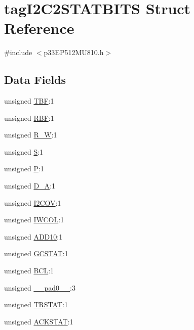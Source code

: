 \hypertarget{structtag_i2_c2_s_t_a_t_b_i_t_s}{}\section{tag\+I2\+C2\+S\+T\+A\+T\+B\+I\+TS Struct Reference}
\label{structtag_i2_c2_s_t_a_t_b_i_t_s}


{\ttfamily \#include $<$p33\+E\+P512\+M\+U810.\+h$>$}

\subsection*{Data Fields}
\begin{DoxyCompactItemize}
\item 
unsigned \hyperlink{structtag_i2_c2_s_t_a_t_b_i_t_s_a2cc28964983ef17d96cf9e2230c5df82}{T\+BF}\+:1
\item 
unsigned \hyperlink{structtag_i2_c2_s_t_a_t_b_i_t_s_a2a122c4acd2f697495e96c0339681673}{R\+BF}\+:1
\item 
unsigned \hyperlink{structtag_i2_c2_s_t_a_t_b_i_t_s_abfd46c8176d9ae8afba1de4e4e0be703}{R\+\_\+W}\+:1
\item 
unsigned \hyperlink{structtag_i2_c2_s_t_a_t_b_i_t_s_a144c5a43162033ca0ba61e313283eed8}{S}\+:1
\item 
unsigned \hyperlink{structtag_i2_c2_s_t_a_t_b_i_t_s_a805106850ead18446c151e2c6b76f992}{P}\+:1
\item 
unsigned \hyperlink{structtag_i2_c2_s_t_a_t_b_i_t_s_ac64d8520a04a591aebca9ddaf19c4c33}{D\+\_\+A}\+:1
\item 
unsigned \hyperlink{structtag_i2_c2_s_t_a_t_b_i_t_s_a7ec41682da03f9233113b5d0814261e2}{I2\+C\+OV}\+:1
\item 
unsigned \hyperlink{structtag_i2_c2_s_t_a_t_b_i_t_s_a89f19265fe046252142c93c690df6f69}{I\+W\+C\+OL}\+:1
\item 
unsigned \hyperlink{structtag_i2_c2_s_t_a_t_b_i_t_s_aa91b39587cc9aca4d68fec2d99702a07}{A\+D\+D10}\+:1
\item 
unsigned \hyperlink{structtag_i2_c2_s_t_a_t_b_i_t_s_a1afb6549d7ce979283e5013aebe9f5cc}{G\+C\+S\+T\+AT}\+:1
\item 
unsigned \hyperlink{structtag_i2_c2_s_t_a_t_b_i_t_s_acead45594aa9d4a55a37f37fdcc3f0a0}{B\+CL}\+:1
\item 
unsigned \hyperlink{structtag_i2_c2_s_t_a_t_b_i_t_s_adf71f3d8410c1f1dbbc96680a92c49af}{\+\_\+\+\_\+pad0\+\_\+\+\_\+}\+:3
\item 
unsigned \hyperlink{structtag_i2_c2_s_t_a_t_b_i_t_s_ab0728a3da8f26dbbebc4740b6b4c3531}{T\+R\+S\+T\+AT}\+:1
\item 
unsigned \hyperlink{structtag_i2_c2_s_t_a_t_b_i_t_s_a696033ba403a9897eb7d8b480bea697d}{A\+C\+K\+S\+T\+AT}\+:1
\end{DoxyCompactItemize}


